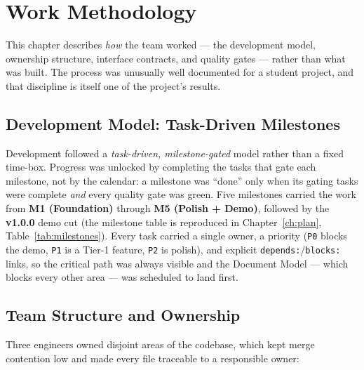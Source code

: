 
\chapter{Work Methodology}
\label{ch:methodology}

This chapter describes \emph{how} the team worked --- the development model,
ownership structure, interface contracts, and quality gates --- rather than what
was built. The process was unusually well documented for a student project, and
that discipline is itself one of the project's results.

\section{Development Model: Task-Driven Milestones}
Development followed a \emph{task-driven, milestone-gated} model rather than a
fixed time-box. Progress was unlocked by completing the tasks that gate each
milestone, not by the calendar: a milestone was ``done'' only when its gating tasks
were complete \emph{and} every quality gate was green. Five milestones carried the
work from \textbf{M1 (Foundation)} through \textbf{M5 (Polish + Demo)}, followed by
the \textbf{v1.0.0} demo cut (the milestone table is reproduced in
Chapter~\ref{ch:plan}, Table~\ref{tab:milestones}). Every task carried a single
owner, a priority (\texttt{P0} blocks the demo, \texttt{P1} is a Tier-1 feature,
\texttt{P2} is polish), and explicit \texttt{depends:}/\texttt{blocks:} links, so
the critical path was always visible and the Document Model --- which blocks every
other area --- was scheduled to land first.

\section{Team Structure and Ownership}
Three engineers owned disjoint areas of the codebase, which kept merge contention
low and made every file traceable to a responsible owner:

